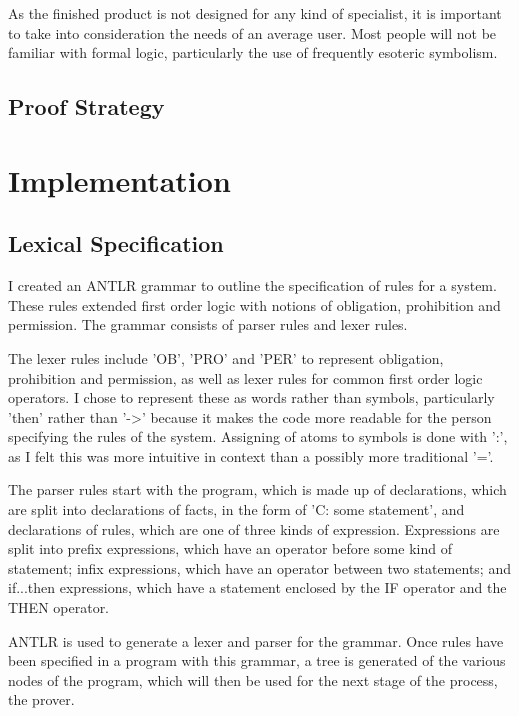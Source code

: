 \documentclass{l4proj}
\begin{document}
As the finished product is not designed for any kind of specialist, it is important to take into consideration the needs of an average user. Most people will not be familiar with formal logic, particularly the use of frequently esoteric symbolism. 


\section{Proof Strategy}


\chapter{Implementation}

\section{Lexical Specification}

I created an ANTLR grammar to outline the specification of rules for a system. These rules extended first order logic with notions of obligation, prohibition and permission. The grammar consists of parser rules and lexer rules. 

The lexer rules include 'OB', 'PRO' and 'PER' to represent obligation, prohibition and permission, as well as lexer rules for common first order logic operators. I chose to represent these as words rather than symbols, particularly 'then' rather than '->' because it makes the code more readable for the person specifying the rules of the system. Assigning of atoms to symbols is done with ':', as I felt this was more intuitive in context than a possibly more traditional '='. 

The parser rules start with the program, which is made up of declarations, which are split into declarations of facts, in the form of 'C: some statement', and declarations of rules, which are one of three kinds of expression. Expressions are split into prefix expressions, which have an operator before some kind of statement; infix expressions, which have an operator between two statements; and if...then expressions, which have a statement enclosed by the IF operator and the THEN operator. 

ANTLR is used to generate a lexer and parser for the grammar. Once rules have been specified in a program with this grammar, a tree is generated of the various nodes of the program, which will then be used for the next stage of the process, the prover. 
\end{document}
